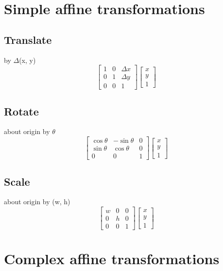\documentclass{article}
\begin{document}
\section{Simple affine transformations}

\subsection{Translate}
by $\Delta$(x, y)
\[
\begin{bmatrix}
1 & 0 & \Delta x\\
0 & 1 & \Delta y\\
0 & 0 & 1
\end{bmatrix}
\begin{bmatrix}
x\\
y\\
1
\end{bmatrix}
\]

\subsection{Rotate}
about origin
by $\theta$
\[
\begin{bmatrix}
\cos \theta & -\sin \theta & 0\\
\sin \theta &  \cos \theta & 0\\
0 & 0 & 1
\end{bmatrix}
\begin{bmatrix}
x\\
y\\
1
\end{bmatrix}
\]

\subsection{Scale}
about origin
by (w, h)
\[
\begin{bmatrix}
w & 0 & 0\\
0 & h & 0\\
0 & 0 & 1
\end{bmatrix}
\begin{bmatrix}
x\\
y\\
1
\end{bmatrix}
\]

\section{Complex affine transformations}
\end{document}
